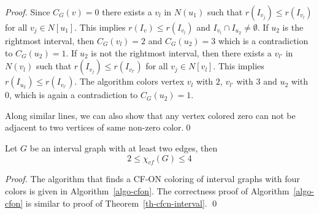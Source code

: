 \documentclass[svgnames]{llncs}
\newcommand{\cfon}{\textsc {CF-ON}}
\begin{document}
\begin{proof}
Since $C_G(v)=0$ there exists a $v_l$ in $N(u_1)$ such that 
 $r(I_{v_j}) \leq r(I_{v_l})$ for all $v_j \in N[u_1]$. This implies $r(I_{v}) \leq r(I_{v_l})$ and $I_{v_l} \cap I_{u_2} \neq \emptyset$. 
If $u_2$ is the rightmost interval, then $C_G(v_l)=2$ and $C_G(u_2)=3$ which is a contradiction to $C_G(u_2)=1$. 
If $u_2$ is not the rightmost interval, then
there exists a $v_{l'}$ in $N(v_l)$ such that 
$r(I_{v_j}) \leq r(I_{v_{l'}})$ for all $v_j \in N[v_l]$. This implies $r(I_{u_2}) \leq r(I_{v_{l'}})$.
The algorithm colors vertex $v_l$ with $2$, $v_{l'}$ with $3$ and $u_2$ with $0$, which is again a contradiction to $C_G(u_2)=1$. 
 
Along similar lines, we can also show that any vertex colored zero can not be adjacent to two vertices of same non-zero color.\qed

\end{proof}

\begin{theorem}
Let $G$ be an interval graph with at least two edges, then $$2 \leq \chi_{cf}(G) \leq 4$$
\end{theorem}
\begin{proof}
The algorithm that finds a \cfon{} coloring of interval graphs with four colors is given in Algorithm~\ref{algo-cfon}.
The correctness proof of Algorithm~\ref{algo-cfon} is similar to proof of Theorem~\ref{th-cfcn-interval}.   \qed
\end{proof}
\end{document}
